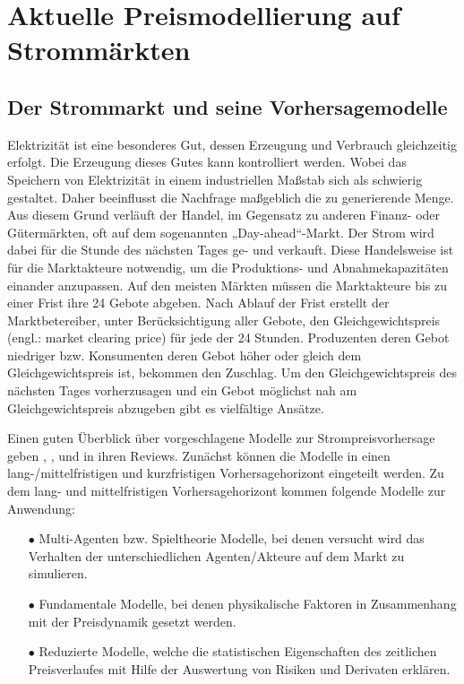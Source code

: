 

\section{Aktuelle Preismodellierung auf Strommärkten}


\subsection{Der Strommarkt und seine Vorhersagemodelle}

Elektrizität ist eine besonderes Gut, dessen Erzeugung und Verbrauch gleichzeitig erfolgt. Die Erzeugung dieses Gutes kann kontrolliert werden. Wobei das Speichern von Elektrizität in einem industriellen Maßstab sich als schwierig gestaltet. Daher beeinflusst die Nachfrage maßgeblich die zu generierende Menge. Aus diesem Grund verläuft der Handel, im Gegensatz zu anderen Finanz- oder Gütermärkten, oft auf dem sogenannten „Day-ahead“-Markt. Der Strom wird dabei für die Stunde des nächsten Tages ge- und verkauft. Diese Handelsweise ist für die Marktakteure notwendig, um die Produktions- und Abnahmekapazitäten einander anzupassen. Auf den meisten Märkten müssen die Marktakteure bis zu einer Frist ihre 24 Gebote abgeben. Nach Ablauf der Frist erstellt der Marktbetereiber, unter Berücksichtigung aller Gebote, den Gleichgewichtspreis (engl.: market clearing price) für jede der 24 Stunden. Produzenten deren Gebot niedriger bzw. Konsumenten deren Gebot höher oder gleich dem Gleichgewichtspreis ist, bekommen den Zuschlag. Um den Gleichgewichtspreis des nächsten Tages vorherzusagen und ein Gebot möglichst nah am Gleichgewichtspreis abzugeben gibt es vielfältige Ansätze.

Einen guten Überblick über vorgeschlagene Modelle zur Strompreisvorhersage geben \citet{Daneshi2008}, \citet{Aggarwal2009}, \citet{Cerjan2013}  und \citet{Weron2014} in ihren Reviews. Zunächst können die Modelle in einen lang-/mittelfristigen und kurzfristigen Vorhersagehorizont eingeteilt werden. Zu dem lang- und mittelfristigen Vorhersagehorizont kommen folgende Modelle zur Anwendung:
\begin{itemize}
\item[\textbf{$\bullet$}]%
Multi-Agenten bzw. Spieltheorie Modelle, bei denen versucht wird das Verhalten der unterschiedlichen Agenten/Akteure auf dem Markt zu simulieren.

\item[\textbf{$\bullet$}]%
Fundamentale Modelle, bei denen physikalische Faktoren in Zusammenhang mit der Preisdynamik gesetzt werden.

\item[\textbf{$\bullet$}]%
Reduzierte Modelle, welche die statistischen Eigenschaften des zeitlichen Preisverlaufes mit Hilfe der Auswertung von Risiken und Derivaten erklären.
\end{itemize}

